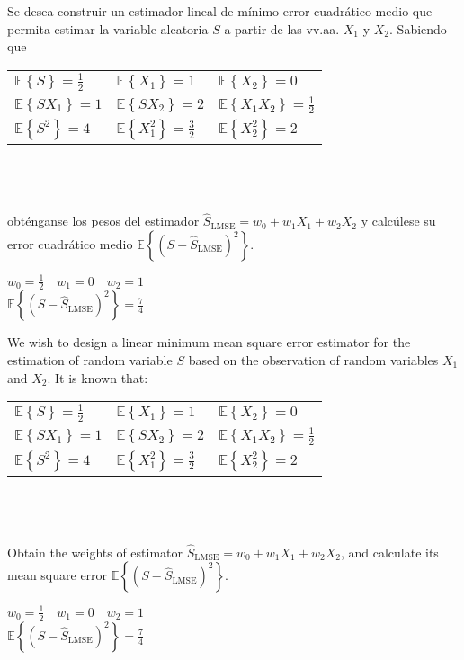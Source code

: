 \ifspanish

\question Se desea construir un estimador lineal de mínimo error cuadrático medio que permita estimar la variable aleatoria $S$ a partir de las vv.aa. $X_1$ y $X_2$. Sabiendo que\\

\begin{tabular}{lll}
$\mathbb E\left\lbrace S \right\rbrace=\displaystyle\frac{1}{2}$ & $\mathbb E\left\lbrace X_1 \right\rbrace=1$  & $\mathbb E\left\lbrace X_2 \right\rbrace=0$  \\

$\mathbb E\left\lbrace SX_1 \right\rbrace=1$ & $\mathbb E\left\lbrace SX_2 \right\rbrace=2$  & $\mathbb E\left\lbrace X_1X_2 \right\rbrace=\displaystyle\frac{1}{2}$  \\

$\mathbb E\left\lbrace S^2 \right\rbrace=4$ & $\mathbb E\left\lbrace X_1^2 \right\rbrace=\displaystyle\frac{3}{2}$  & $\mathbb E\left\lbrace X_2^2 \right\rbrace=2$  
\end{tabular}
\\ ~\\ ~\\
obténganse los pesos del estimador  $\hat{S}_\text{LMSE}=w_0+w_{1}X_1+w_2X_2$ y calcúlese su error cuadrático medio $\mathbb E\left\lbrace(S-\hat{S}_\text{LMSE})^2\right\rbrace$.

\begin{solution}
$ w_0=\displaystyle\frac{1}{2} \quad w_1=0 \quad w_2=1$\\
$\mathbb E\left\lbrace(S-\hat{S}_\text{LMSE})^2\right\rbrace=\displaystyle\frac{7}{4}$
\end{solution}

\else

\question We wish to design a linear minimum mean square error estimator for the estimation of random variable $S$ based on the observation of random variables $X_1$ and $X_2$. It is known that:\\

\begin{tabular}{lll}
$\mathbb E\left\lbrace S \right\rbrace=\displaystyle\frac{1}{2}$ & $\mathbb E\left\lbrace X_1 \right\rbrace=1$  & $\mathbb E\left\lbrace X_2 \right\rbrace=0$  \\

$\mathbb E\left\lbrace SX_1 \right\rbrace=1$ & $\mathbb E\left\lbrace SX_2 \right\rbrace=2$  & $\mathbb E\left\lbrace X_1X_2 \right\rbrace=\displaystyle\frac{1}{2}$  \\

$\mathbb E\left\lbrace S^2 \right\rbrace=4$ & $\mathbb E\left\lbrace X_1^2 \right\rbrace=\displaystyle\frac{3}{2}$  & $\mathbb E\left\lbrace X_2^2 \right\rbrace=2$  
\end{tabular}
\\ ~\\ ~\\
Obtain the weights of estimator  $\hat{S}_\text{LMSE}=w_0+w_{1}X_1+w_2X_2$, and calculate its mean square error $\mathbb E\left\lbrace(S-\hat{S}_\text{LMSE})^2\right\rbrace$.

\begin{solution}
$ w_0=\displaystyle\frac{1}{2} \quad w_1=0 \quad w_2=1$\\
$\mathbb E\left\lbrace(S-\hat{S}_\text{LMSE})^2\right\rbrace=\displaystyle\frac{7}{4}$
\end{solution}

\fi